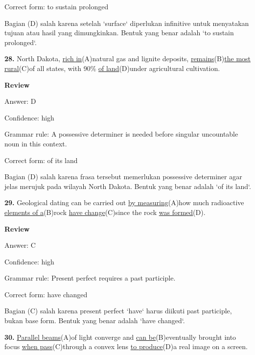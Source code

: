 \documentclass[12pt]{article}
\begin{document}
Correct form: to sustain prolonged\par
Bagian (D) salah karena setelah `surface` diperlukan infinitive untuk menyatakan tujuan atau hasil yang dimungkinkan. Bentuk yang benar adalah `to sustain prolonged`.\par
\endgroup
\par
\vspace{\questionblockgap}
\noindent\textbf{28.} North Dakota, \uline{rich in}(A)natural gas and lignite deposits, \uline{remains}(B)\uline{the most rural}(C)of all states, with 90\% \uline{of land}(D)under agricultural cultivation.
\par
\begingroup
\setlength{\parskip}{0pt}
\setlength{\parindent}{0pt}
\textbf{Review}\par
Answer: D\par
Confidence: high\par
Grammar rule: A possessive determiner is needed before singular uncountable noun in this context.\par
Correct form: of its land\par
Bagian (D) salah karena frasa tersebut memerlukan possessive determiner agar jelas merujuk pada wilayah North Dakota. Bentuk yang benar adalah `of its land`.\par
\endgroup
\par
\vspace{\questionblockgap}
\noindent\textbf{29.} Geological dating can be carried out \uline{by measuring}(A)how much radioactive \uline{elements of a}(B)rock \uline{have change}(C)since the rock \uline{was formed}(D).
\par
\begingroup
\setlength{\parskip}{0pt}
\setlength{\parindent}{0pt}
\textbf{Review}\par
Answer: C\par
Confidence: high\par
Grammar rule: Present perfect requires a past participle.\par
Correct form: have changed\par
Bagian (C) salah karena present perfect `have` harus diikuti past participle, bukan base form. Bentuk yang benar adalah `have changed`.\par
\endgroup
\par
\vspace{\questionblockgap}
\noindent\textbf{30.} \uline{Parallel beams}(A)of light converge and \uline{can be}(B)eventually brought into focus \uline{when pass}(C)through a convex lens \uline{to produce}(D)a real image on a screen.
\par
\end{document}
